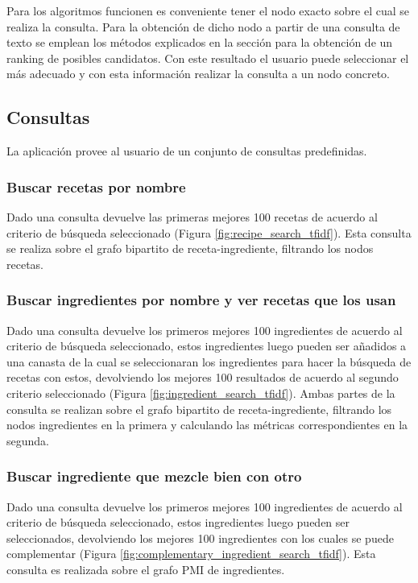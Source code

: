 \documentclass[
	a4paper, %
	10pt, %
	unnumberedsections, %
	twoside, %
]{LTJournalArticle}
\begin{document}
Para los algoritmos funcionen es conveniente tener el nodo exacto sobre el cual se realiza la consulta. Para la
obtención de dicho nodo a partir de una consulta de texto se emplean los métodos explicados en la sección 
 para la obtención de un ranking de posibles candidatos. Con este resultado el usuario
puede seleccionar el más adecuado y con esta información realizar la consulta a un nodo concreto.

\subsection{Consultas}

La aplicación provee al usuario de un conjunto de consultas predefinidas.

\subsubsection{Buscar recetas por nombre}

Dado una consulta devuelve las primeras mejores 100 recetas de acuerdo al criterio de búsqueda seleccionado
(Figura \ref{fig:recipe_search_tfidf}).
Esta consulta se realiza sobre el grafo bipartito de receta-ingrediente, filtrando los nodos recetas. 

\subsubsection{Buscar ingredientes por nombre y ver recetas que los usan}

Dado una consulta devuelve los primeros mejores 100 ingredientes de acuerdo al criterio de búsqueda seleccionado,
estos ingredientes luego pueden ser añadidos a una canasta de la cual se seleccionaran los ingredientes para hacer
la búsqueda de recetas con estos, devolviendo los mejores 100 resultados de acuerdo al segundo criterio seleccionado
(Figura \ref{fig:ingredient_search_tfidf}).
Ambas partes de la consulta se realizan sobre el grafo bipartito de receta-ingrediente, filtrando los nodos 
ingredientes en la primera y calculando las métricas correspondientes en la segunda.

\subsubsection{Buscar ingrediente que mezcle bien con otro}

Dado una consulta devuelve los primeros mejores 100 ingredientes de acuerdo al criterio de búsqueda seleccionado,
estos ingredientes luego pueden ser seleccionados, devolviendo los mejores 100 ingredientes con los cuales se puede 
complementar (Figura \ref{fig:complementary_ingredient_search_tfidf}). Esta consulta es realizada sobre el grafo 
PMI de ingredientes.
\end{document}
